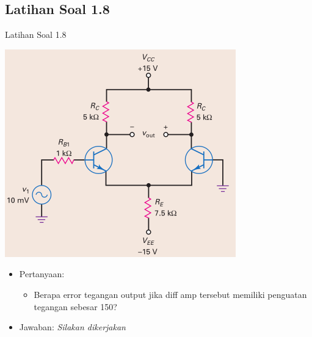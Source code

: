 \documentclass[aspectratio=169]{beamer}
\begin{document}
\subsection{Latihan Soal 1.8}
\begin{frame}{Latihan Soal 1.8}
	\begin{multicols}{2}
		\begin{center}
			\includegraphics[height=0.7\textheight]{gambar/01.latihan_soal_8}
		\end{center}
		\columnbreak
		\begin{itemize}
			\item Pertanyaan:
			\begin{itemize}
				\item Berapa error tegangan output jika diff amp tersebut memiliki penguatan tegangan sebesar 150?
			\end{itemize}
			\item Jawaban: \textit{Silakan dikerjakan}
		\end{itemize}
	\end{multicols}
\end{frame}
\end{document}
